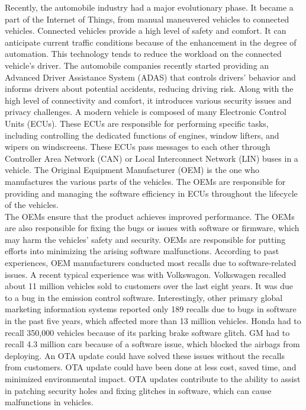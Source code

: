 \documentclass[12pt,a4paper]{article}
\begin{document}
Recently, the automobile industry had a major evolutionary phase. It became a part of the Internet of Things, from manual maneuvered vehicles to connected vehicles. Connected vehicles provide a high level of safety and comfort. It can anticipate current traffic conditions because of the enhancement in the degree of automation. This technology tends to reduce the workload on the connected vehicle's driver. The automobile companies recently started providing an Advanced Driver Assistance System (ADAS) that controls drivers' behavior and informs drivers about potential accidents, reducing driving risk. Along with the high level of connectivity and comfort, it introduces various security issues and privacy challenges. A modern vehicle is composed of many Electronic Control Units (ECUs). These ECUs are responsible for performing specific tasks, including controlling the dedicated functions of engines, window lifters, and wipers on windscreens. These ECUs pass messages to each other through Controller Area Network (CAN) or Local Interconnect Network (LIN) buses in a vehicle. The Original Equipment Manufacturer (OEM) is the one who manufactures the various parts of the vehicles. The OEMs are responsible for providing and managing the software efficiency in ECUs throughout the lifecycle of the vehicles. \cite{r6} \\

The OEMs ensure that the product achieves improved performance. The OEMs are also responsible for fixing the bugs or issues with software or firmware, which may harm the vehicles' safety and security. OEMs are responsible for putting efforts into minimizing the arising software malfunctions. According to past experiences, OEM manufacturers conducted most recalls due to software-related issues. A recent typical experience was with Volkswagon. Volkswagen recalled about 11 million vehicles sold to customers over the last eight years. It was due to a bug in the emission control software. Interestingly, other primary global marketing information systems reported only 189 recalls due to bugs in software in the past five years, which affected more than 13 million vehicles. Honda had to recall 350,000 vehicles because of its parking brake software glitch. GM had to recall 4.3 million cars because of a software issue, which blocked the airbags from deploying. An OTA update could have solved these issues without the recalls from customers. OTA update could have been done at less cost, saved time, and minimized environmental impact. OTA updates contribute to the ability to assist in patching security holes and fixing glitches in software, which can cause malfunctions in vehicles. \cite{r6} \\
\end{document}

